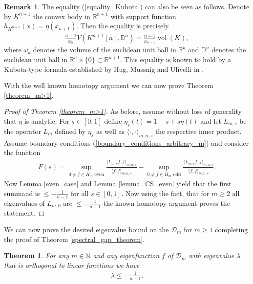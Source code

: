 \documentclass[12pt,twoside]{amsart}
\numberwithin{satz}{section}
\newtheorem{theorem}[satz]{Theorem}
\theoremstyle{definition}
\newtheorem{remark}[satz]{Remark}
\numberwithin{equation}{section}
\newcommand\R{\mathbb{R}}
\newcommand\N{\mathbb{N}}
\newcommand\vol{\operatorname{vol}}
\begin{document}
	
	\begin{remark}
		The equality (\ref{equality_Kubota}) can also be seen as follows. Denote by $K^{n+1}$ the convex body in $\R^{n+1}$ with support function $h_{K^{n+1}}(x)=\eta(x_{n+1})$. Then the equality is precisely
		\begin{align*}
			\frac{n+1}{\omega_n}V(K^{n+1}[n],\mathbb{D}^n)=\frac{n-1}{\omega_{n-1}}\vol(K),
		\end{align*}
		where $\omega_k$ denotes the volume of the euclidean unit ball in $\R^k$ and $\mathbb{D}^n$ denotes the euclidean unit ball in $\R^n\times\{0\}\subset \R^{n+1}$. This equality is known to hold by a Kubota-type formula established by Hug, Mussnig and Ulivelli in \cite[Theorem 1.1]{hugmussnigulivelli}.
	\end{remark}

	With the well known homotopy argument we can now prove Theorem \ref{theorem_m>1}.
	
	\begin{proof}[Proof of Theorem \ref{theorem_m>1}]
		As before, assume without loss of generality that $\eta$ is analytic. For $s\in [0,1]$ define $\eta_s(t)=1-s+s\eta(t)$ and let $L_{m,s}$ be the operator $L_m$ defined by $\eta_s$ as well as $\langle\cdot,\cdot\rangle_{m,n,s}$ the respective inner product. Assume boundary conditions (\ref{boundary_conditions_arbitrary_m}) and consider the function
		\begin{align}\label{definition_F(s)_m>1}
			F(s)= \sup_{0\neq\overline{f}\in H_m \text{ even}} \frac{\langle L_{m,s}\overline{f},\overline{f}\rangle_{m,n,s}}{\langle \overline{f},\overline{f}\rangle_{m,n,s}}-\sup_{0\neq\overline{f}\in H_m \text{ odd}} \frac{\langle L_{m,s}\overline{f},\overline{f}\rangle_{m,n,s}}{\langle \overline{f},\overline{f}\rangle_{m,n,s}}.
		\end{align}
		Now Lemma \ref{even_case} and Lemma \ref{lemma_CS_even} yield that the first summand is $\leq -\frac{1}{n-1}$ for all $s\in[0,1]$. Now using the fact, that for $m\geq 2$ all eigenvalues of $L_{m,0}$ are $\leq -\frac{1}{n-1}$ the known homotopy argument proves the statement.
	\end{proof}
	
	We can now prove the desired eigenvalue bound on the $\mathcal{D}_m$ for $m\geq 1$ completing the proof of Theorem \ref{spectral_gap_theorem}.
	
	\begin{theorem}\label{theorem_m>0}
		For any $m\in\N$ and any eigenfunction $f$ of $\mathcal{D}_m$ with eigenvalue $\lambda$ that is orthogonal to linear functions we have 
		\begin{align*}
			\lambda \leq -\frac{1}{n-1}.
		\end{align*}
	\end{theorem}
	
\end{document}
